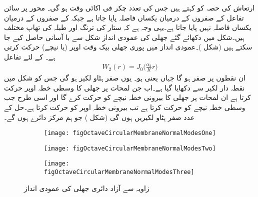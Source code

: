 ارتعاش کی  حصہ  کو  کہتے ہیں جس کی تعدد  چکر فی اکائی وقت ہو گی۔  محور پر سائن تفاعل کے صفروں کے درمیان یکساں فاصلہ پایا جاتا ہے  جبکہ  کے صفروں کے درمیان یکساں فاصلہ نہیں پایا جاتا ہے۔یہی وجہ ہے کہ ستار کی ترنگ اور طبلہ کی تھاپ  مختلف ہیں۔شکل میں دکھائے گئے جھلی کی عمودی انداز شکل  سے با آسانی حاصل کیے جا سکتے ہیں (شکل )۔عمودی انداز  میں پوری جھلی بیک وقت اوپر (یا نیچے) حرکت کرتی ہے۔ کے لئے تفاعل
\begin{align*}
W_2(r)=J_0\big(\frac{\alpha_2}{R}r\big)
\end{align*}
ان نقطوں پر صفر ہو گا جہاں   یعنی  ہو۔ یوں  صفر ہٹاو لکیر ہو گی جس کو شکل  میں نقطہ دار لکیر سے دکھایا گیا ہے۔اب جن لمحات پر جھلی کا وسطی خطہ اوپر حرکت کرتا ہے ان لمحات پر جھلی کا بیرونی خطہ  نیچے کو حرکت کرے گا اور اسی طرح جب وسطی خطہ نیچے کو حرکت کرتا ہے تب بیرونی خطہ اوپر کو حرکت کرتا ہے۔حل  کے  عدد صفر ہٹاو لکیریں ہوں گی (شکل ) جو ہم مرکز دائرے ہوں گے۔
%  
\begin{figure}
\centering
\begin{subfigure}{0.33\textwidth}
\centering
\texttt{[image: figOctaveCircularMembraneNormalModesOne]}
\end{subfigure}%
\begin{subfigure}{0.33\textwidth}
\centering
\texttt{[image: figOctaveCircularMembraneNormalModesTwo]}
\end{subfigure}%
\begin{subfigure}{0.33\textwidth}
\centering
\texttt{[image: figOctaveCircularMembraneNormalModesThree]}
\end{subfigure}%
\caption{زاویہ سے آزاد دائری جھلی کی عمودی انداز}
\label{شکل_جزوی_دائری_عمودی_انداز}
\end{figure}

%

